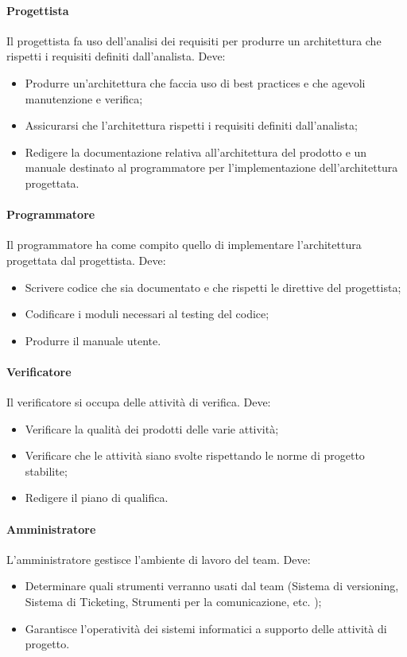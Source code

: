 \paragraph{Progettista} \Spazio
Il progettista fa uso dell'analisi dei requisiti per produrre un architettura che rispetti i requisiti definiti dall'analista. Deve:
\begin{itemize} 
\item Produrre un'architettura che faccia uso di best practices e che agevoli manutenzione e verifica;
\item Assicurarsi che l'architettura rispetti i requisiti definiti dall'analista;
\item Redigere la documentazione relativa all'architettura del prodotto e un manuale destinato al programmatore per l'implementazione dell'architettura progettata.
\end{itemize}

\paragraph{Programmatore} \Spazio
Il programmatore ha come compito quello di implementare l'architettura progettata dal progettista. Deve:
\begin{itemize} 
\item Scrivere codice che sia documentato e che rispetti le direttive del progettista;
\item Codificare i moduli necessari al testing del codice;
\item Produrre il manuale utente.
\end{itemize}

\paragraph{Verificatore} \Spazio
Il verificatore si occupa delle attività di verifica. Deve:
\begin{itemize} 
\item Verificare la qualità dei prodotti delle varie attività;
\item Verificare che le attività siano svolte rispettando le norme di progetto stabilite;
\item Redigere il piano di qualifica.
\end{itemize}

\paragraph{Amministratore} \Spazio
L'amministratore gestisce l'ambiente di lavoro del team. Deve:
\begin{itemize} 
\item Determinare quali strumenti verranno usati dal team (Sistema di versioning, Sistema di Ticketing, Strumenti per la comunicazione, etc. );
\item Garantisce l'operatività dei sistemi informatici a supporto delle attività di progetto.
\end{itemize}

